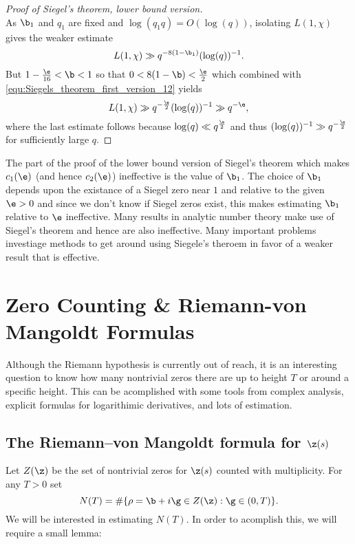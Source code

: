 \begin{proof}[Proof of Siegel's theorem, lower bound version]
\[        \]
        As $\b_{1}$ and $q_{1}$ are fixed and $\log(q_{1}q) = O(\log(q))$, isolating $L(1,\chi)$ gives the weaker estimate
        \begin{equation}\label{equ:Siegels_theorem_first_version_12}
          L(1,\chi) \gg q^{-8(1-\b_{1})}(\log(q))^{-1}.
        \end{equation}
        But $1-\frac{\e}{16} < \b < 1$ so that $0 < 8(1-\b) < \frac{\e}{2}$ which combined with \cref{equ:Siegels_theorem_first_version_12} yields
        \[
          L(1,\chi) \gg q^{-\frac{\e}{2}}(\log(q))^{-1} \gg q^{-\e},
        \]
        where the last estimate follows because $\log(q) \ll q^{\frac{\e}{2}}$ and thus $(\log(q))^{-1} \gg q^{-\frac{\e}{2}}$ for sufficiently large $q$.
      \end{proof}

      The part of the proof of the lower bound version of Siegel's theorem which makes $c_{1}(\e)$ (and hence $c_{2}(\e)$) ineffective is the value of $\b_{1}$. The choice of $\b_{1}$ depends upon the existance of a Siegel zero near $1$ and relative to the given $\e > 0$ and since we don't know if Siegel zeros exist, this makes estimating $\b_{1}$ relative to $\e$ ineffective. Many results in analytic number theory make use of Siegel's theorem and hence are also ineffective. Many important problems investiage methods to get around using Siegele's theroem in favor of a weaker result that is effective.
  \section{Zero Counting \& Riemann-von Mangoldt Formulas}
    Although the Riemann hypothesis is currently out of reach, it is an interesting question to know how many nontrivial zeros there are up to height $T$ or around a specific height. This can be acomplished with some tools from complex analysis, explicit formulas for logarithimic derivatives, and lots of estimation.
    \subsection*{The Riemann–von Mangoldt formula for $\z(s)$}
      Let $Z(\z)$ be the set of nontrivial zeros for $\z(s)$ counted with multiplicity. For any $T > 0$ set
      \[
        N(T) = \#\{\rho = \b+i\g \in Z(\z): \g \in (0,T)\}.
      \]
      We will be interested in estimating $N(T)$. In order to acomplish this, we will require a small lemma:

